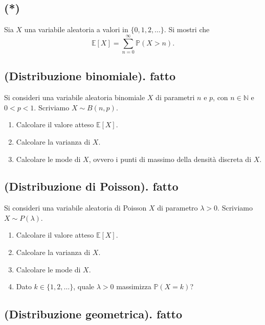 \subsection{(*)}

Sia $X$ una variabile aleatoria a valori in $\{0,1,2,\dotsc \}$. Si mostri che
\begin{equation*}
\mathbb{E}[ X] =\sum\limits _{n=0}^{\infty }\mathbb{P}( X >n) .
\end{equation*}
\subsection{(Distribuzione binomiale). fatto}

Si consideri una variabile aleatoria binomiale $X$ di parametri $n$ e $p$, con $n\in \mathbb{N}$ e $0< p< 1$. Scriviamo $X\sim B( n,p)$.
\begin{enumerate}
\item Calcolare il valore atteso $\mathbb{E}[ X]$.
\item Calcolare la varianza di $X$.
\item Calcolare le mode di $X$, ovvero i punti di massimo della densità discreta di $X$.
\end{enumerate}
\subsection{(Distribuzione di Poisson). fatto}

Si consideri una variabile aleatoria di Poisson $X$ di parametro $\lambda  >0$. Scriviamo $X\sim P( \lambda )$.
\begin{enumerate}
\item Calcolare il valore atteso $\mathbb{E}[ X]$.
\item Calcolare la varianza di $X$.
\item Calcolare le mode di $X$.
\item Dato $k\in \{1,2,\dotsc \}$, quale $\lambda  >0$ massimizza $\mathbb{P}( X=k)$?
\end{enumerate}
\subsection{(Distribuzione geometrica). fatto}

